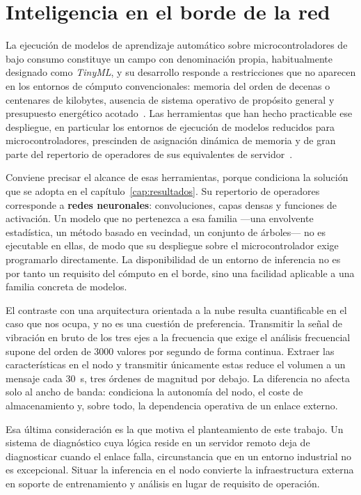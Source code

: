 \section{Inteligencia en el borde de la red}

La ejecución de modelos de aprendizaje automático sobre microcontroladores de bajo consumo
constituye un campo con denominación propia, habitualmente designado como \textit{TinyML}, y
su desarrollo responde a restricciones que no aparecen en los entornos de cómputo
convencionales: memoria del orden de decenas o centenares de kilobytes, ausencia de sistema
operativo de propósito general y presupuesto energético acotado~\cite{warden2019}. Las
herramientas que han hecho practicable ese despliegue, en particular los entornos de
ejecución de modelos reducidos para microcontroladores, prescinden de asignación dinámica de
memoria y de gran parte del repertorio de operadores de sus equivalentes de
servidor~\cite{david2021}.

Conviene precisar el alcance de esas herramientas, porque condiciona la solución que se adopta
en el capítulo~\ref{cap:resultados}. Su repertorio de operadores corresponde a
\textbf{redes neuronales}: convoluciones, capas densas y funciones de activación. Un modelo que
no pertenezca a esa familia —una envolvente estadística, un método basado en vecindad, un
conjunto de árboles— no es ejecutable en ellas, de modo que su despliegue sobre el
microcontrolador exige programarlo directamente. La disponibilidad de un entorno de inferencia
no es por tanto un requisito del cómputo en el borde, sino una facilidad aplicable a una
familia concreta de modelos.

El contraste con una arquitectura orientada a la nube resulta cuantificable en el caso que
nos ocupa, y no es una cuestión de preferencia. Transmitir la señal de vibración en bruto de
los tres ejes a la frecuencia que exige el análisis frecuencial supone del orden de 3000
valores por segundo de forma continua. Extraer las características en el nodo y transmitir
únicamente estas reduce el volumen a un mensaje cada \mbox{30 s}, tres órdenes de magnitud por
debajo. La diferencia no afecta solo al ancho de banda: condiciona la autonomía del nodo, el
coste de almacenamiento y, sobre todo, la dependencia operativa de un enlace externo.

Esa última consideración es la que motiva el planteamiento de este trabajo. Un sistema de
diagnóstico cuya lógica reside en un servidor remoto deja de diagnosticar cuando el enlace
falla, circunstancia que en un entorno industrial no es excepcional. Situar la inferencia en
el nodo convierte la infraestructura externa en soporte de entrenamiento y análisis en lugar
de requisito de operación.

